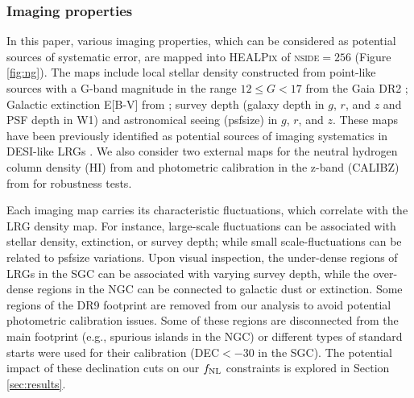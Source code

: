\subsubsection{Imaging properties}
In this paper, various imaging properties, which can be considered as potential sources of systematic error, are mapped into \textsc{HEALPix} of \textsc{nside}$=256$ (Figure \ref{fig:ng}). The maps include local stellar density constructed from point-like sources with a G-band magnitude in the range $12 \leq G < 17$ from the Gaia DR2 \citep[see,][]{gaiadr2, myers2022}; Galactic extinction E[B-V] from \cite{schlegel1998maps}; survey depth (galaxy depth in $g$, $r$, and $z$ and PSF depth in W1) and astronomical seeing (psfsize) in $g$, $r$, and $z$. These maps have been previously identified as potential sources of imaging systematics in DESI-like LRGs \cite{zhou2022target}. We also consider two external maps for the neutral hydrogen column density (HI) from \cite{2016A&A...594A.116H} and photometric calibration in the z-band (CALIBZ) from  for robustness tests.

Each imaging map carries its characteristic fluctuations, which correlate with the LRG density map. For instance, large-scale fluctuations can be associated with stellar density, extinction, or survey depth; while small scale-fluctuations can be related to psfsize variations. Upon visual inspection, the under-dense regions of LRGs in the SGC can be associated with varying survey depth, while the over-dense regions in the NGC can be connected to galactic dust or extinction. Some regions of the DR9 footprint are removed from our analysis to avoid potential photometric calibration issues. Some of these regions are disconnected from the main footprint (e.g., spurious islands in the NGC) or different types of standard starts were used for their calibration (DEC$<-30$ in the SGC). The potential impact of these declination cuts on our $f_{\rm NL}$ constraints is explored in Section \ref{sec:results}. 

